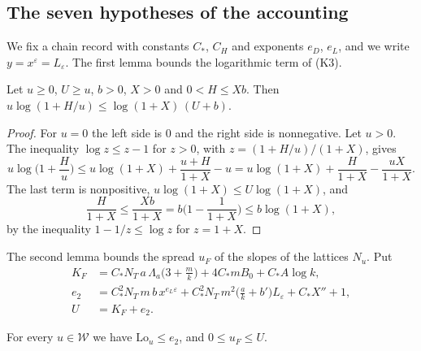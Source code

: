 \subsection{The seven hypotheses of the accounting}\label{r6:R6:sec:A1A7}

We fix a chain record with constants $C_\ast$, $C_H$ and exponents $e_D$, $e_L$, and we write $y=x^{\varepsilon}=L_\varepsilon$. The first lemma bounds the logarithmic term of (K3).

\begin{lemma}\label{r6:R6:lem:phi}
Let $u\ge0$, $U\ge u$, $b>0$, $X>0$ and $0<H\le Xb$. Then $u\log(1+H/u)\le\log(1+X)\,(U+b)$.
\end{lemma}

\begin{proof}
For $u=0$ the left side is $0$ and the right side is nonnegative. Let $u>0$. The inequality $\log z\le z-1$ for $z>0$, with $z=(1+H/u)/(1+X)$, gives
\[
u\log\Big(1+\frac Hu\Big)\le u\log(1+X)+\frac{u+H}{1+X}-u=u\log(1+X)+\frac H{1+X}-\frac{uX}{1+X}.
\]
The last term is nonpositive, $u\log(1+X)\le U\log(1+X)$, and
\[
\frac H{1+X}\le\frac{Xb}{1+X}=b\Big(1-\frac1{1+X}\Big)\le b\log(1+X),
\]
by the inequality $1-1/z\le\log z$ for $z=1+X$.
\end{proof}

The second lemma bounds the spread $u_F$ of the slopes of the lattices $N_u$. Put
\begin{align*}
K_F&=C_\ast N_T\,a\,\Lambda_a\Big(3+\frac mk\Big)+4C_\ast mB_0+C_\ast A\log k,\\
e_2&=C_\ast^2N_T\,m\,b\,x^{e_L\varepsilon}+C_\ast^2N_T\,m^2\Big(\frac ak+b'\Big)L_\varepsilon+C_\ast X''+1,\\
U&=K_F+e_2 .
\end{align*}

\begin{lemma}\label{r6:R6:lem:uF}
For every $u\in\mathcal W$ we have $\mathrm{Lo}_u\le e_2$, and $0\le u_F\le U$.
\end{lemma}

